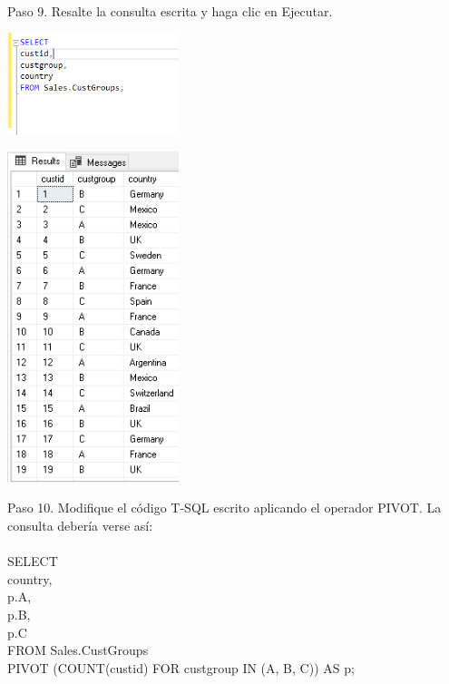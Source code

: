 \begin{flushleft}
\textbf{}\\
Paso 9. Resalte la consulta escrita y haga clic en Ejecutar.
\begin{center}
	\includegraphics[width=5cm]{./Imagenes/img9} 
	\end{center}
\begin{center}
	\includegraphics[width=5cm]{./Imagenes/img91} 
	\end{center}


Paso 10. Modifique el código T-SQL escrito aplicando el operador PIVOT. La consulta debería verse así:
\textbf{}\\
\textbf{}\\
SELECT\\
country,\\
p.A,\\
p.B,\\
p.C\\
FROM Sales.CustGroups\\
PIVOT (COUNT(custid) FOR custgroup IN (A, B, C)) AS p;\\


\end{flushleft}
